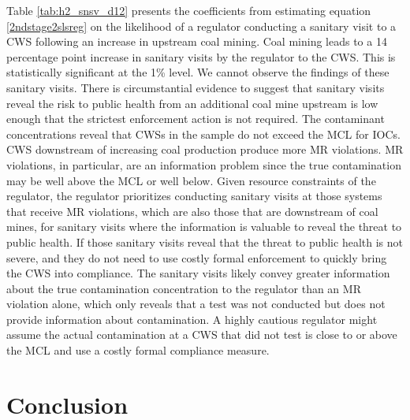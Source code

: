 \documentclass{article}
\begin{document}
Table \ref{tab:h2_snsv_d12} presents the coefficients from estimating equation \ref{2ndstage2slsreg} on the likelihood of a regulator conducting a sanitary visit to a CWS following an increase in upstream coal mining. Coal mining leads to a 14 percentage point increase in sanitary visits by the regulator to the CWS. This is statistically significant at the 1\% level. We cannot observe the findings of these sanitary visits. There is circumstantial evidence to suggest that sanitary visits reveal the risk to public health from an additional coal mine upstream is low enough that the strictest enforcement action is not required. The contaminant concentrations reveal that CWSs in the sample do not exceed the MCL for IOCs. CWS downstream of increasing coal production produce more MR violations. MR violations, in particular, are an information problem since the true contamination may be well above the MCL or well below. Given resource constraints of the regulator, the regulator prioritizes conducting sanitary visits at those systems that receive MR violations, which are also those that are downstream of coal mines, for sanitary visits where the information is valuable to reveal the threat to public health. If those sanitary visits reveal that the threat to public health is not severe, and they do not need to use costly formal enforcement to quickly bring the CWS into compliance. The sanitary visits likely convey greater information about the true contamination concentration to the regulator than an MR violation alone, which only reveals that a test was not conducted but does not provide information about contamination. A highly cautious regulator might assume the actual contamination at a CWS that did not test is close to or above the MCL and use a costly formal compliance measure.








\section{Conclusion}
\end{document}
